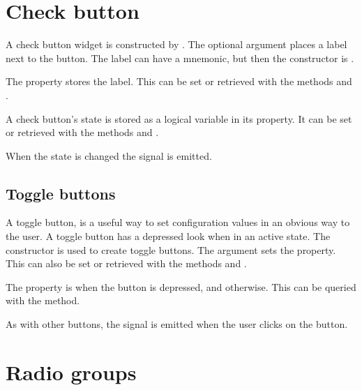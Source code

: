 

\section{Check button}
\label{sec:RGtk2:gtkCheckbox}

A check button widget is constructed by . The
optional argument  places a label next
to the button. The label can have a mnemonic, but then the constructor
is  .

The  property stores the label. This can be set or
retrieved with the methods  and
. 

A check button's state is stored as a logical variable in its
 property. It can be set or retrieved with the methods
 and
. 

When the state is changed the  signal is emitted.


\subsection{Toggle buttons}
\label{sec:ToggleButtons}

A toggle button, is a useful way to set configuration values in an
obvious way to the user.  A toggle button has a depressed look when in
an active state. The  constructor is
used to create toggle buttons. The 
argument sets the  property. This can also be set or
retrieved with the methods  and
.

The  property is  when the button is
depressed, and  otherwise. This can be queried with the
 method.

As with other buttons, the  signal is emitted when the user
clicks on the button.


\section{Radio groups}
\label{sec:RGtk2:gtkRadioButton}

